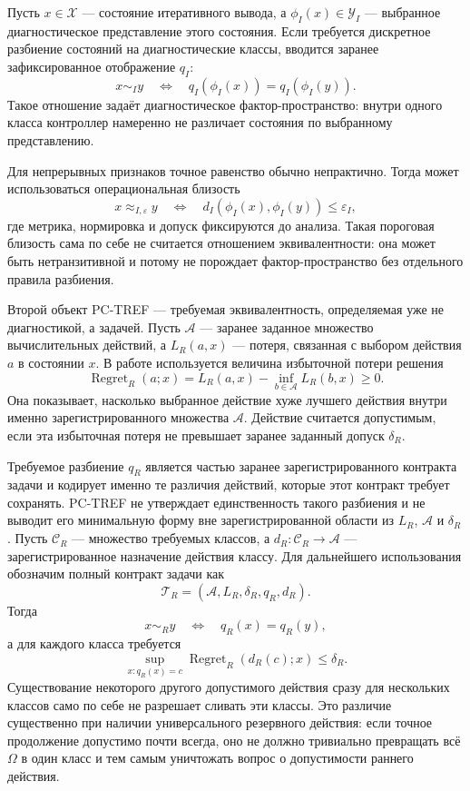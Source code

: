 Пусть $x\in\mathcal X$ --- состояние итеративного вывода, а
$\phi_I(x)\in\mathcal Y_I$ --- выбранное диагностическое представление этого
состояния. Если требуется дискретное разбиение состояний на диагностические
классы, вводится заранее зафиксированное отображение $q_I$:
\[
  x\sim_I y
  \quad\Longleftrightarrow\quad
  q_I\!\left(\phi_I(x)\right)=q_I\!\left(\phi_I(y)\right).
\]
Такое отношение задаёт диагностическое фактор-пространство: внутри одного
класса контроллер намеренно не различает состояния по выбранному
представлению.

Для непрерывных признаков точное равенство обычно непрактично. Тогда может
использоваться операциональная близость
\[
  x\approx_{I,\varepsilon}y
  \quad\Longleftrightarrow\quad
  d_I\!\left(\phi_I(x),\phi_I(y)\right)\leq\varepsilon_I,
\]
где метрика, нормировка и допуск фиксируются до анализа. Такая пороговая
близость сама по себе не считается отношением эквивалентности: она может быть
нетранзитивной и потому не порождает фактор-пространство без отдельного
правила разбиения.

Второй объект PC-TREF --- требуемая эквивалентность, определяемая уже не
диагностикой, а задачей. Пусть $\mathcal A$ --- заранее заданное множество
вычислительных действий, а $L_R(a,x)$ --- потеря, связанная с выбором действия
$a$ в состоянии $x$. В работе используется величина избыточной потери решения
\[
  \operatorname{Regret}_R(a;x)
  =L_R(a,x)-\inf_{b\in\mathcal A}L_R(b,x)\geq 0.
\]
Она показывает, насколько выбранное действие хуже лучшего действия внутри
именно зарегистрированного множества $\mathcal A$. Действие считается
допустимым, если эта избыточная потеря не превышает заранее заданный допуск
$\delta_R$.

Требуемое разбиение $q_R$ является частью заранее зарегистрированного
контракта задачи и кодирует именно те различия действий, которые этот контракт
требует сохранять. PC-TREF не утверждает единственность такого разбиения и не
выводит его минимальную форму вне зарегистрированной области из $L_R$,
$\mathcal A$ и $\delta_R$. Пусть $\mathcal C_R$ --- множество требуемых
классов, а $d_R:\mathcal C_R\rightarrow\mathcal A$ --- зарегистрированное
назначение действия классу. Для дальнейшего использования обозначим полный
контракт задачи как
\[
  \mathcal T_R=(\mathcal A,L_R,\delta_R,q_R,d_R).
\]
Тогда
\[
  x\sim_R y
  \quad\Longleftrightarrow\quad
  q_R(x)=q_R(y),
\]
а для каждого класса требуется
\[
  \sup_{x:q_R(x)=c}
  \operatorname{Regret}_R\!\left(d_R(c);x\right)\leq\delta_R.
\]
Существование некоторого другого допустимого действия сразу для нескольких
классов само по себе не разрешает сливать эти классы. Это различие существенно
при наличии универсального резервного действия: если точное продолжение
допустимо почти всегда, оно не должно тривиально превращать всё $\Omega$ в
один класс и тем самым уничтожать вопрос о допустимости раннего действия.

